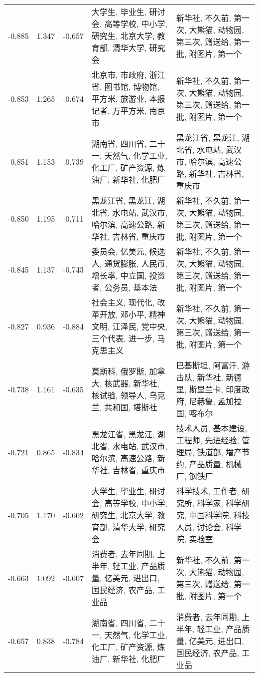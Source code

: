 \begin{tabular}{cccp{5cm}p{5cm}}
-0.885 & 1.347 & -0.657 & 大学生, 毕业生, 研讨会, 高等学校, 中小学, 研究生, 北京大学, 教育部, 清华大学, 研究会 & 新华社, 不久前, 第一次, 大熊猫, 动物园, 第三次, 赠送给, 第一批, 附图片, 第一个 \\
-0.853 & 1.265 & -0.674 & 北京市, 市政府, 浙江省, 图书馆, 博物馆, 平方米, 旅游业, 本报记者, 万平方米, 南京市 & 新华社, 不久前, 第一次, 大熊猫, 动物园, 第三次, 赠送给, 第一批, 附图片, 第一个 \\
-0.851 & 1.153 & -0.739 & 湖南省, 四川省, 二十一, 天然气, 化学工业, 化工厂, 矿产资源, 炼油厂, 新华社, 化肥厂 & 黑龙江省, 黑龙江, 湖北省, 水电站, 武汉市, 哈尔滨, 高速公路, 新华社, 吉林省, 重庆市 \\
-0.850 & 1.195 & -0.711 & 黑龙江省, 黑龙江, 湖北省, 水电站, 武汉市, 哈尔滨, 高速公路, 新华社, 吉林省, 重庆市 & 新华社, 不久前, 第一次, 大熊猫, 动物园, 第三次, 赠送给, 第一批, 附图片, 第一个 \\
-0.845 & 1.137 & -0.743 & 委员会, 亿美元, 候选人, 通货膨胀, 人民币, 增长率, 中立国, 投资者, 公务员, 基本法 & 新华社, 不久前, 第一次, 大熊猫, 动物园, 第三次, 赠送给, 第一批, 附图片, 第一个 \\
-0.827 & 0.936 & -0.884 & 社会主义, 现代化, 改革开放, 邓小平, 精神文明, 江泽民, 党中央, 三个代表, 进一步, 马克思主义 & 新华社, 不久前, 第一次, 大熊猫, 动物园, 第三次, 赠送给, 第一批, 附图片, 第一个 \\
-0.738 & 1.161 & -0.635 & 莫斯科, 俄罗斯, 加拿大, 核武器, 新华社, 核试验, 领导人, 乌克兰, 共和国, 塔斯社 & 巴基斯坦, 阿富汗, 游击队, 新华社, 新德里, 斯里兰卡, 印度政府, 尼赫鲁, 孟加拉国, 喀布尔 \\
-0.721 & 0.865 & -0.834 & 黑龙江省, 黑龙江, 湖北省, 水电站, 武汉市, 哈尔滨, 高速公路, 新华社, 吉林省, 重庆市 & 技术人员, 基本建设, 工程师, 先进经验, 管理局, 铁道部, 增产节约, 产品质量, 机械厂, 钢铁厂 \\
-0.705 & 1.170 & -0.602 & 大学生, 毕业生, 研讨会, 高等学校, 中小学, 研究生, 北京大学, 教育部, 清华大学, 研究会 & 科学技术, 工作者, 研究所, 科学家, 科学研究, 中国科学院, 科技人员, 讨论会, 科学院, 实验室 \\
-0.663 & 1.092 & -0.607 & 消费者, 去年同期, 上半年, 轻工业, 产品质量, 亿美元, 进出口, 国民经济, 农产品, 工业品 & 新华社, 不久前, 第一次, 大熊猫, 动物园, 第三次, 赠送给, 第一批, 附图片, 第一个 \\
-0.657 & 0.838 & -0.784 & 湖南省, 四川省, 二十一, 天然气, 化学工业, 化工厂, 矿产资源, 炼油厂, 新华社, 化肥厂 & 消费者, 去年同期, 上半年, 轻工业, 产品质量, 亿美元, 进出口, 国民经济, 农产品, 工业品 \\

\end{tabular}
